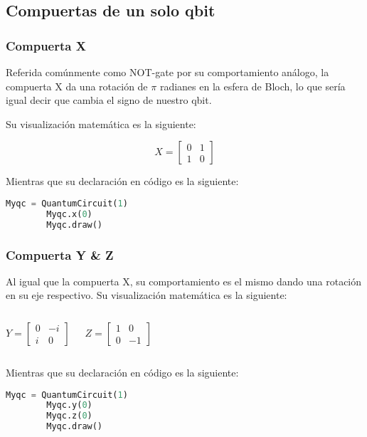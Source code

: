 \documentclass[spanish]{beamer}
\begin{document}
     \subsection{Compuertas de un solo qbit}
     \begin{frame}[fragile]
     \frametitle{Compuerta X} 
     Referida comúnmente como NOT-gate por su comportamiento análogo, la compuerta X da una rotación de $\pi$ radianes en  la esfera de Bloch, lo que sería igual decir que cambia el signo de nuestro qbit.
     
    Su visualización matemática es la siguiente:

    \begin{equation}
        X=\begin{bmatrix}
            0 & 1\\
            
            1 & 0
        \end{bmatrix}
    \end{equation}

     Mientras que su declaración en código es la siguiente:
     
      \begin{lstlisting}[language=Python]
        Myqc = QuantumCircuit(1)
        Myqc.x(0)
        Myqc.draw() \end{lstlisting}
     \end{frame}
     \newpage
    \begin{frame}[fragile]
     \frametitle{Compuerta Y & Z} 
    Al igual que la compuerta X, su comportamiento es el mismo dando una rotación en su eje respectivo.
    Su visualización matemática es la siguiente:

     \begin{columns}
       \begin{equation}
        Y=\begin{bmatrix}
            0 & -i\\
            i & 0
        \end{bmatrix}
        \end{equation}
        
       \begin{equation}
        Z=\begin{bmatrix}
            1 & 0\\
            0 & -1
        \end{bmatrix}
        \end{equation}
    
    \end{columns} 
    Mientras que su declaración en código es la siguiente:
      \begin{lstlisting}[language=Python]
        Myqc = QuantumCircuit(1)
        Myqc.y(0)
        Myqc.z(0)
        Myqc.draw() \end{lstlisting}
        \end{frame}
   
\end{document}
